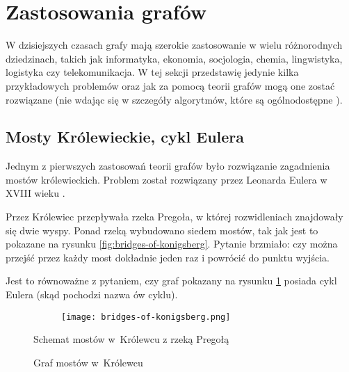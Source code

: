 \section{Zastosowania grafów}

W dzisiejszych czasach grafy mają szerokie zastosowanie w wielu różnorodnych dziedzinach, takich jak informatyka, ekonomia, socjologia, chemia, lingwistyka, logistyka czy telekomunikacja. W tej sekcji przedstawię jedynie kilka przykładowych problemów oraz jak za pomocą teorii grafów mogą one zostać rozwiązane (nie wdając się w szczegóły algorytmów, które są ogólnodostępne \cites{cormen}{bondy}{banachowski}).


\subsection*{Mosty Królewieckie, cykl Eulera}

Jednym z pierwszych zastosowań teorii grafów było rozwiązanie zagadnienia mostów królewieckich. Problem został rozwiązany przez Leonarda Eulera w XVIII wieku \cite[48]{wilson}. 

Przez Królewiec przepływała rzeka Pregoła, w której rozwidleniach znajdowały się dwie wyspy. Ponad rzeką wybudowano siedem mostów, tak jak jest to pokazane na rysunku \ref{fig:bridges-of-konigsberg}. Pytanie brzmiało: czy można przejść przez każdy most dokładnie jeden raz i powrócić do punktu wyjścia. 

Jest to równoważne z pytaniem, czy graf pokazany na rysunku \ref{fig:bridges-graph} posiada cykl Eulera (skąd pochodzi nazwa ów cyklu). 

\begin{figure}[H]
\centering
\begin{minipage}[b]{.45\textwidth}
  \centering
  \begin{figure}[H]
  \centering
  \texttt{[image: bridges-of-konigsberg.png]}
  \end{figure}
\captionsetup{justification=centering}
\caption{Schemat mostów w~Królewcu z rzeką Pregołą \cite{wilson}}
\label{fig:bridges-of-konigsberg}
\end{minipage}
\begin{minipage}[b]{.45\textwidth}
  \centering
\captionsetup{justification=centering}
\caption{Graf mostów w~Królewcu} \label{fig:bridges-graph}
\end{minipage}
\end{figure}


